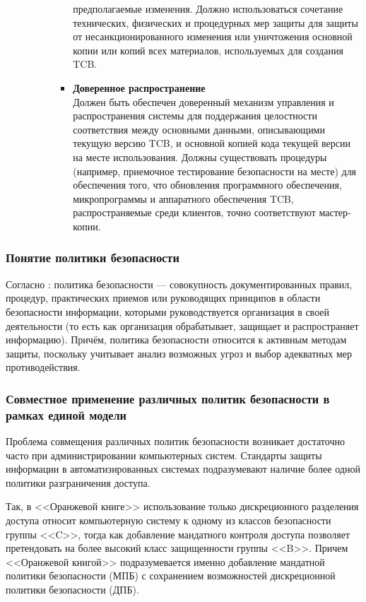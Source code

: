 \begin{enumerate}
\begin{enumerate}
\begin{enumerate}
\begin{itemize}
				предполагаемые изменения. Должно использоваться сочетание технических, физических и процедурных мер защиты для защиты от несанкционированного изменения или 
				уничтожения основной копии или копий всех материалов, используемых для создания TCB.
				\item{\textbf{Доверенное распространение}}\\
				Должен быть обеспечен доверенный механизм управления и распространения системы для поддержания целостности соответствия между основными данными, описывающими текущую версию TCB, 
				и основной копией кода текущей версии на месте использования. Должны существовать процедуры (например, приемочное тестирование безопасности на месте) для обеспечения того, 
				что обновления программного обеспечения, микропрограммы и аппаратного обеспечения TCB, распространяемые среди клиентов, точно соответствуют мастер-копии.
			\end{itemize}
		\end{enumerate}
	\end{enumerate}
\end{enumerate}


\subsubsection{Понятие политики безопасности}
Согласно \cite{GOST50922}: политика безопасности --- совокупность документированных
правил, процедур, практических приемов или руководящих принципов в области безопасности
информации, которыми руководствуется организация в своей деятельности (то есть как организация
обрабатывает, защищает и распространяет информацию). Причём, политика безопасности относится
к активным методам защиты, поскольку учитывает анализ возможных угроз и выбор адекватных мер
противодействия.

\subsubsection{Совместное применение различных политик безопасности в рамках единой модели}
Проблема совмещения различных политик безопасности возникает достаточно часто при администрировании компьютерных систем. Стандарты защиты информации в автоматизированных системах подразумевают наличие более одной политики разграничения доступа.

Так, в <<Оранжевой книге>> использование только дискреционного разделения доступа относит компьютерную систему к одному из классов безопасности группы <<C>>, тогда как добавление мандатного контроля доступа позволяет претендовать на более высокий класс защищенности группы <<B>>. Причем <<Оранжевой книгой>> подразумевается именно добавление мандатной политики безопасности (МПБ) с сохранением возможностей дискреционной политики безопасности (ДПБ).

